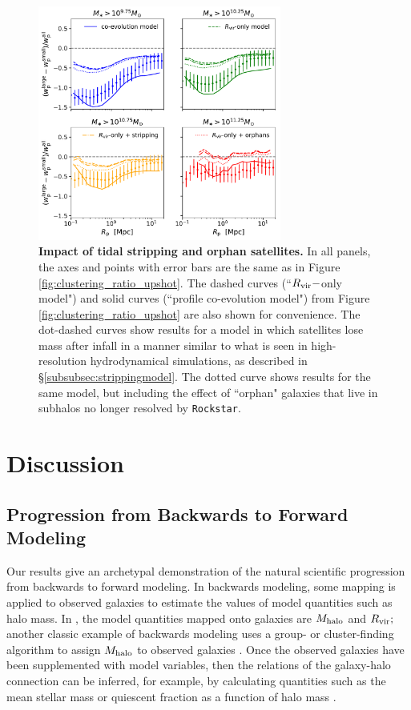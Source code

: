 \documentclass[usenatbib,usegraphicx,letterpaper]{mn2e}
\newcommand{\mhalo}{M_{\rm halo}}
\newcommand{\rvir}{R_{\rm vir}}
\begin{document}
\begin{figure}
\centering
\includegraphics[width=8cm]{FIGS/penultimate_clustering_ratios_alternate_models.pdf}
\caption{
{\bf Impact of tidal stripping and orphan satellites.} In all panels, the axes and points with error bars are the same as in Figure \ref{fig:clustering_ratio_upshot}. The dashed curves (``$\rvir-$only model") and solid curves (``profile co-evolution model") from  Figure \ref{fig:clustering_ratio_upshot} are also shown for convenience. The dot-dashed curves show results for a model in which satellites lose mass after infall in a manner similar to what is seen in high-resolution hydrodynamical simulations, as described in \S\ref{subsubsec:strippingmodel}. The dotted curve shows results for the same model, but including the effect of ``orphan" galaxies that live in subhalos no longer resolved by {\tt Rockstar}.
}
\label{fig:strippingorphans}
\end{figure}

\section{Discussion}
\label{sec:discussion}

\subsection{Progression from Backwards to Forward Modeling}
\label{subsec:forwardsmodeling}

Our results give an archetypal demonstration of the natural scientific progression from backwards to forward modeling. In backwards modeling, some mapping is applied to observed galaxies to estimate the values of model quantities such as halo mass. In \citet{kravtsov13}, the model quantities mapped onto galaxies are $\mhalo$ and $\rvir;$ another classic example of backwards modeling uses a group- or cluster-finding algorithm to assign $\mhalo$ to observed galaxies \citep[e.g.,][]{berlind_etal06,yang_etal05a,rykoff_etal14}. Once the observed galaxies have been supplemented with model variables, then the relations of the galaxy-halo connection can be inferred, for example, by calculating quantities such as the mean stellar mass or quiescent fraction as a function of halo mass \citep[e.g.,][]{yang_etal05b,weinmann_etal06}.
\end{document}
